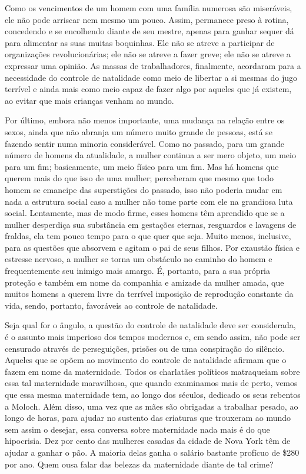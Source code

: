Como os vencimentos de um homem com uma família numerosa são miseráveis,
ele não pode arriscar nem mesmo um pouco. Assim, permanece preso à
rotina, concedendo e se encolhendo diante de seu mestre, apenas para
ganhar sequer dá para alimentar as suas muitas boquinhas. Ele não se
atreve a participar de organizações revolucionárias; ele não se atreve a
fazer greve; ele não se atreve a expressar uma opinião. As massas de
trabalhadores, finalmente, acordaram para a necessidade do controle de
natalidade como meio de libertar a si mesmas do jugo terrível e ainda
mais como meio capaz de fazer algo por aqueles que já existem, ao evitar
que mais crianças venham ao mundo.

Por último, embora não menos importante, uma mudança na relação entre os
sexos, ainda que não abranja um número muito grande de pessoas, está se
fazendo sentir numa minoria considerável. Como no passado, para um
grande número de homens da atualidade, a mulher continua a ser mero
objeto, um meio para um fim; basicamente, um meio físico para um fim.
Mas há homens que querem mais do que isso de uma mulher; perceberam que
mesmo que todo homem se emancipe das superstições do passado, isso não
poderia mudar em nada a estrutura social caso a mulher não tome parte
com ele na grandiosa luta social. Lentamente, mas de modo firme, esses
homens têm aprendido que se a mulher desperdiça sua substância em
gestações eternas, resguardos e lavagens de fraldas, ela tem pouco tempo
para o que quer que seja. Muito menos, inclusive, para as questões que
absorvem e agitam o pai de seus filhos. Por exaustão física e estresse
nervoso, a mulher se torna um obstáculo no caminho do homem e
frequentemente seu inimigo mais amargo. É, portanto, para a sua própria
proteção e também em nome da companhia e amizade da mulher amada, que
muitos homens a querem livre da terrível imposição de reprodução
constante da vida, sendo, portanto, favoráveis ao controle de
natalidade.

Seja qual for o ângulo, a questão do controle de natalidade deve ser
considerada, é o assunto mais imperioso dos tempos modernos e, em sendo
assim, não pode ser censurado através de perseguições, prisões ou de uma
conspiração do silêncio. Aqueles que se opõem ao movimento do controle
de natalidade afirmam que o fazem em nome da maternidade. Todos os
charlatães políticos matraqueiam sobre essa tal maternidade maravilhosa,
que quando examinamos mais de perto, vemos que essa mesma maternidade
tem, ao longo dos séculos, dedicado os seus rebentos a Moloch. Além
disso, uma vez que as mães são obrigadas a trabalhar pesado, ao longo de
horas, para ajudar no sustento das criaturas que trouxeram ao mundo sem
assim o desejar, essa conversa sobre maternidade nada mais é do que
hipocrisia. Dez por cento das mulheres casadas da cidade de Nova York
têm de ajudar a ganhar o pão. A maioria delas ganha o salário bastante
profícuo de \$280 por ano. Quem ousa falar das belezas da maternidade
diante de tal crime?

